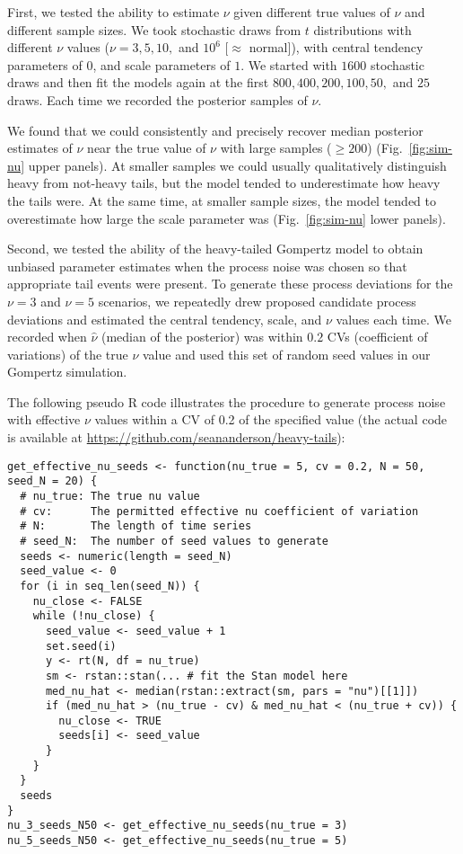 \documentclass[12pt]{article}
\begin{document}
First, we tested the ability to estimate $\nu$ given different true values of
$\nu$ and different sample sizes. We took stochastic draws from $t$
distributions with different $\nu$ values ($\nu = 3, 5, 10,$ and $10^6$
[$\approx$ normal]), with central tendency parameters of $0$, and scale
parameters of $1$. We started with $1600$ stochastic draws and then fit the
models again at the first $800, 400, 200, 100, 50,$ and $25$ draws. Each time
we recorded the posterior samples of $\nu$.

We found that we could consistently and precisely recover median posterior
estimates of \(\nu\) near the true value of \(\nu\) with large samples (\(\ge
200\)) (Fig.~\ref{fig:sim-nu} upper panels). At smaller samples we could
usually qualitatively distinguish heavy from not-heavy tails, but the model
tended to underestimate how heavy the tails were. At the same time, at smaller
sample sizes, the model tended to overestimate how large the scale parameter
was (Fig.~\ref{fig:sim-nu} lower panels).

Second, we tested the ability of the heavy-tailed Gompertz model to obtain
unbiased parameter estimates when the process noise was chosen so that
appropriate tail events were present. To generate these process deviations for
the $\nu = 3$ and $\nu = 5$ scenarios, we repeatedly drew proposed candidate
process deviations and estimated the central tendency, scale, and $\nu$ values
each time. We recorded when $\hat{\nu}$ (median of the posterior) was within
$0.2$ CVs (coefficient of variations) of the true $\nu$ value and used this
set of random seed values in our Gompertz simulation.

The following pseudo R code illustrates the procedure to generate process
noise with effective $\nu$ values within a CV of 0.2 of the specified value
(the actual code is available at
\url{https://github.com/seananderson/heavy-tails}):

\clearpage

\begin{footnotesize}
\begin{verbatim}
get_effective_nu_seeds <- function(nu_true = 5, cv = 0.2, N = 50, seed_N = 20) {
  # nu_true: The true nu value
  # cv:      The permitted effective nu coefficient of variation
  # N:       The length of time series
  # seed_N:  The number of seed values to generate
  seeds <- numeric(length = seed_N)
  seed_value <- 0
  for (i in seq_len(seed_N)) {
    nu_close <- FALSE
    while (!nu_close) {
      seed_value <- seed_value + 1
      set.seed(i)
      y <- rt(N, df = nu_true)
      sm <- rstan::stan(... # fit the Stan model here
      med_nu_hat <- median(rstan::extract(sm, pars = "nu")[[1]])
      if (med_nu_hat > (nu_true - cv) & med_nu_hat < (nu_true + cv)) {
        nu_close <- TRUE
        seeds[i] <- seed_value
      }
    }
  }
  seeds
}
nu_3_seeds_N50 <- get_effective_nu_seeds(nu_true = 3)
nu_5_seeds_N50 <- get_effective_nu_seeds(nu_true = 5)
\end{verbatim}
\end{footnotesize}
\end{document}
